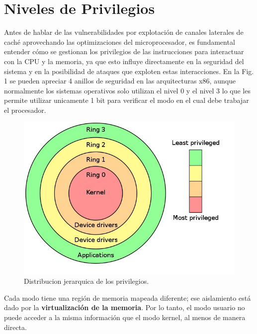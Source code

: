 \documentclass[lettersize,compsoc]{IEEEtran}
\begin{document}
\section{Niveles de Privilegios}
Antes de hablar de las vulnerabilidades por explotación de canales laterales de caché aprovechando las optimizaciones del microprocesador, es fundamental entender cómo se gestionan los privilegios de las instrucciones para interactuar con la CPU y la memoria, ya que esto influye directamente en la seguridad del sistema y en la posibilidad de ataques que exploten estas interacciones.
\newline
En la Fig. 1 se pueden apreciar 4 anillos de seguridad en las arquitecturas x86, aunque normalmente los sistemas operativos solo utilizan el nivel 0 y el nivel 3 lo que les permite utilizar unicamente 1 bit para verificar el modo en el cual debe trabajar el procesador.
\begin{figure}[h]
  \centering
  \includegraphics[width=\linewidth]{rings.jpg}
  \caption{\small Distribucion jerarquica de los  privilegios.}
  \label{fig:etiqueta}
\end{figure}
\newline
Cada modo tiene una región de memoria mapeada diferente; ese aislamiento está dado por la \textbf{virtualización de la memoria}\cite{Virtualizacion}. Por lo tanto, el modo usuario no puede acceder a la misma información que el modo kernel, al menos de manera directa.
\end{document}
